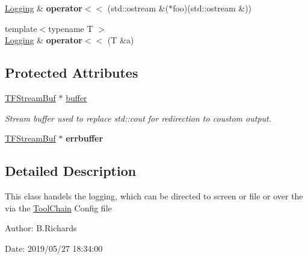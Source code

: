 \begin{DoxyCompactItemize}
\item 
\hypertarget{classLogging_adcbbc7dc2221a2f5fb88dc68089fb91c}{\hyperlink{classLogging}{Logging} \& {\bfseries operator$<$$<$} (std\-::ostream \&($\ast$foo)(std\-::ostream \&))}\label{classLogging_adcbbc7dc2221a2f5fb88dc68089fb91c}

\item 
\hypertarget{classLogging_a4e1557aba6b12232714eead91264587e}{{\footnotesize template$<$typename T $>$ }\\\hyperlink{classLogging}{Logging} \& {\bfseries operator$<$$<$} (T \&a)}\label{classLogging_a4e1557aba6b12232714eead91264587e}

\end{DoxyCompactItemize}
\subsection*{Protected Attributes}
\begin{DoxyCompactItemize}
\item 
\hypertarget{classLogging_a2b1a01d786e51680682452a80b0e45fa}{\hyperlink{classLogging_1_1TFStreamBuf}{T\-F\-Stream\-Buf} $\ast$ \hyperlink{classLogging_a2b1a01d786e51680682452a80b0e45fa}{buffer}}\label{classLogging_a2b1a01d786e51680682452a80b0e45fa}

\begin{DoxyCompactList}\small\item\em Stream buffer used to replace std\-::cout for redirection to coustom output. \end{DoxyCompactList}\item 
\hypertarget{classLogging_ad595cac6dfecdc0c2320595a50fd4d21}{\hyperlink{classLogging_1_1TFStreamBuf}{T\-F\-Stream\-Buf} $\ast$ {\bfseries errbuffer}}\label{classLogging_ad595cac6dfecdc0c2320595a50fd4d21}

\end{DoxyCompactItemize}


\subsection{Detailed Description}
This class handels the logging, which can be directed to screen or file or over the via the \hyperlink{classToolChain}{Tool\-Chain} Config file

\begin{DoxyParagraph}{Author\-:}
B.\-Richards 
\end{DoxyParagraph}
\begin{DoxyParagraph}{Date\-:}
2019/05/27 18\-:34\-:00 
\end{DoxyParagraph}


